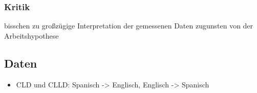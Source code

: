 
\subsubsection{Kritik}
bisschen zu großzügige Interpretation der gemessenen Daten zugunsten von der Arbeitshypothese

\subsection{Daten}
\begin{itemize}
    \item \cite{Valenzuela05} CLD und CLLD: Spanisch -> Englisch, Englisch -> Spanisch
%
%
\end{itemize}
